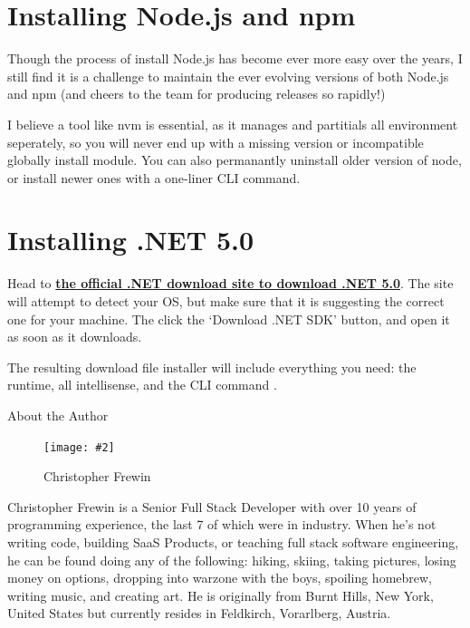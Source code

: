 \documentclass[a4paper,headinclude=on,footinclude=on,12pt,oneside]{scrbook}
\newcommand{\link}[2]{\textbf{\textcolor{monokaiPink}{\href{#2}{#1}}}}
\newcommand{\standardfigure}[3]{\begin{figure}[H]\begin{center}\texttt{[image: \#2]}\caption{#3}\label{fig:#2}\end{center}\end{figure}}
\begin{document}
\begin{appendices}
\chapter{Installing Node.js and npm}

Though the process of install Node.js has become ever more easy over the years, I still find it is a challenge to maintain the ever evolving versions of both Node.js and npm (and cheers to the team for producing releases so rapidly!)

I believe a tool like nvm is essential, as it manages and partitials all environment seperately, so you will never end up with a missing version or incompatible globally install module. You can also permanantly uninstall older version of node, or install newer ones with a one-liner CLI command.

\chapter{Installing .NET 5.0}

Head to \link{the official .NET download site to download .NET 5.0}{https://dotnet.microsoft.com/download}. The site will attempt to detect your OS, but make sure that it is suggesting the correct one for your machine. The click the `Download .NET SDK' button, and open it as soon as it downloads.

The resulting download file installer will include everything you need: the runtime, all intellisense, and the CLI command .

\end{appendices}

\printindex
{}

About the Author

\standardfigure{\textwidth/2}{about/avatar}{Christopher Frewin}

Christopher Frewin is a Senior Full Stack Developer with over 10 years of programming experience, the last 7 of which were in industry. When he's not writing code, building SaaS Products, or teaching full stack software engineering, he can be found doing any of the following: hiking, skiing, taking pictures, losing money on options, dropping into warzone with the boys, spoiling homebrew, writing music, and creating art. He is originally from Burnt Hills, New York, United States but currently resides in Feldkirch, Vorarlberg, Austria.
\end{document}

